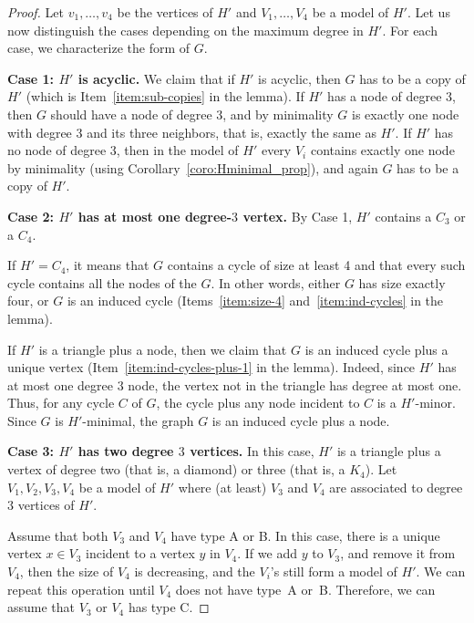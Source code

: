 \documentclass[a4paper,thm-restate,USenglish]{lipics-v2019}
\begin{document}
\begin{proof}
Let $v_1,\ldots,v_4$ be the vertices of $H'$ and $V_1,\ldots,V_4$ be a model of $H'$. 
Let us now distinguish the cases depending on the maximum degree in  $H'$. For each case, we characterize the form of $G$.
\medskip

\noindent
\textbf{Case 1: $H'$ is acyclic.}
We claim that if $H'$ is acyclic, then $G$ has to be a copy of $H'$ (which is  Item~\ref{item:sub-copies} in the lemma).
If $H'$ has a node of degree 3, then $G$ should have a node of degree 3, and by minimality $G$ is exactly one node with degree 3 and its three neighbors, that is, exactly the same as $H'$.
If $H'$ has no node of degree 3, then in the model of $H'$ every $V_i$ contains exactly one node by minimality (using Corollary~\ref{coro:Hminimal_prop}), and again $G$ has to be a copy of $H'$.
\medskip

\noindent
\textbf{Case 2: $H'$ has at most one degree-$3$ vertex.}
By Case 1, $H'$ contains a $C_3$ or a $C_4$. 

If $H'=C_4$, it means that $G$ contains a cycle of size at least 4 and that every such cycle contains all the nodes of the $G$. In other words, either $G$ has size exactly four, or $G$ is an induced cycle (Items~\ref{item:size-4} and~\ref{item:ind-cycles} in the lemma).

If $H'$ is a triangle plus a node, then we claim that $G$ is an induced cycle plus a unique vertex (Item~\ref{item:ind-cycles-plus-1} in the lemma). 
Indeed, since $H'$ has at most one degree $3$ node, the vertex not in the triangle has degree at most one. Thus, for any cycle $C$ of $G$, the cycle plus any node incident to $C$ is a $H'$-minor. Since $G$ is $H'$-minimal, the graph $G$ is an induced cycle plus a node.
\medskip

\noindent
\textbf{Case 3: $H'$ has two degree $3$ vertices.}
In this case, $H'$ is a triangle plus a vertex of degree two (that is, a diamond) or three (that is, a $K_4$). 
Let $V_1, V_2,V_3,V_4$ be a model of $H'$ where (at least) $V_3$ and $V_4$ are associated to degree $3$ vertices of $H'$.

Assume that both $V_3$ and $V_4$ have type A or B. In this case, there is a unique vertex $x \in V_3$ incident to a vertex $y$ in $V_4$. If we add $y$ to $V_3$, and remove it from $V_4$, then the size of $V_4$ is decreasing, and the $V_i$'s still form a model of $H'$. We can repeat this operation until $V_4$ does not have type~A or~B. 
Therefore, we can assume that $V_3$ or $V_4$ has type C. 
\smallskip


\end{proof}
\end{document}
